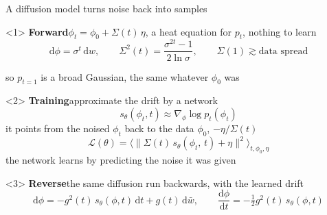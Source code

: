 \documentclass[11pt,t]{beamer}
\newcommand{\rmd}{\mathrm{d}}
\newcommand{\kb}[1]{{\bfseries\color{Kleinblue} #1}}
\begin{document}
\begin{frame}{A diffusion model turns noise back into samples}
\begin{onlyenv}
{\par}
  \end{onlyenv}
  \vspace{0.3em}
  \small
  \begin{onlyenv}<1>
  \kb{Forward}\quad $\phi_t=\phi_0+\Sigma(t)\,\eta$, a heat equation for $p_t$, nothing to learn
  \vspace{-0.3em}
  \begin{equation*}
    \rmd\phi=\sigma^{t}\,\rmd w,\qquad
    \Sigma^2(t)=\frac{\sigma^{2t}-1}{2\ln\sigma},\qquad
    \Sigma(1)\gtrsim\text{data spread}
  \end{equation*}
  \vspace{-0.9em}

  so $p_{t=1}$ is a broad Gaussian, the same whatever $\phi_0$ was
  \end{onlyenv}
  \begin{onlyenv}<2>
  \setlength{\abovedisplayskip}{3pt}\setlength{\belowdisplayskip}{3pt}%
  \setlength{\abovedisplayshortskip}{0pt}\setlength{\belowdisplayshortskip}{3pt}%
  \kb{Training}\quad approximate the drift by a network
  \begin{equation*}
    s_\theta(\phi_t,t)\approx\nabla_\phi\log p_t(\phi_t)
  \end{equation*}
  it points from the noised $\phi_t$ back to the data $\phi_0$, $-\eta/\Sigma(t)$
  \begin{equation*}
    \mathcal L(\theta)=\Big\langle\big\|\Sigma(t)\,s_\theta(\phi_t,\,t)+\eta\big\|^2\Big\rangle_{t,\phi_0,\eta}
  \end{equation*}
  the network learns by \alert{predicting the noise it was given}
  \end{onlyenv}
  \begin{onlyenv}<3>
  \kb{Reverse}\quad the same diffusion run backwards, with the learned drift
  \vspace{-0.3em}
  \begin{equation*}
    \rmd\phi=-g^2(t)\,s_\theta(\phi,t)\,\rmd t+g(t)\,\rmd\bar w,\qquad
    \frac{\rmd\phi}{\rmd t}=-\tfrac12 g^2(t)\,s_\theta(\phi,t)
  \end{equation*}
  \vspace{-0.9em}


\end{onlyenv}
\end{frame}
\end{document}
